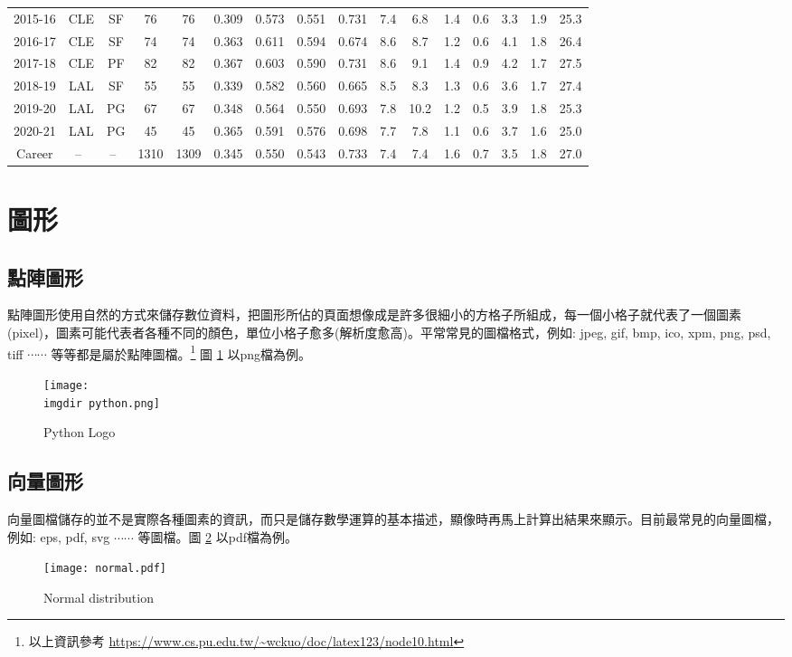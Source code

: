 \begin{table}[H]
\begin{center}
{\begin{tabular}{cccccccccccccccc}
2015-16 & CLE   & SF    & 76    & 76    & 0.309 & 0.573 & 0.551 & 0.731 & 7.4   & 6.8   & 1.4   & 0.6   & 3.3   & 1.9   & 25.3 \\
2016-17 & CLE   & SF    & 74    & 74    & 0.363 & 0.611 & 0.594 & 0.674 & 8.6   & 8.7   & 1.2   & 0.6   & 4.1   & 1.8   & 26.4 \\
2017-18 & CLE   & PF    & 82    & 82    & 0.367 & 0.603 & 0.590 & 0.731 & 8.6   & 9.1   & 1.4   & 0.9   & 4.2   & 1.7   & 27.5 \\
2018-19 & LAL   & SF    & 55    & 55    & 0.339 & 0.582 & 0.560 & 0.665 & 8.5   & 8.3   & 1.3   & 0.6   & 3.6   & 1.7   & 27.4 \\
2019-20 & LAL   & PG    & 67    & 67    & 0.348 & 0.564 & 0.550 & 0.693 & 7.8   & 10.2  & 1.2   & 0.5   & 3.9   & 1.8   & 25.3 \\
2020-21 & LAL   & PG    & 45    & 45    & 0.365 & 0.591 & 0.576 & 0.698 & 7.7   & 7.8   & 1.1   & 0.6   & 3.7   & 1.6   & 25.0 \\
\hline
Career  & --~   & --~   & 1310  & 1309  & 0.345 & 0.550 & 0.543 & 0.733 & 7.4   & 7.4   & 1.6   & 0.7   & 3.5   & 1.8   & 27.0 \\
\end{tabular}}
\end{center}
\end{table}\bigskip \bigskip
\section{圖形}
\subsection{點陣圖形}
點陣圖形使用自然的方式來儲存數位資料，把圖形所佔的頁面想像成是許多很細小的方格子所組成，每一個小格子就代表了一個圖素(pixel)，圖素可能代表者各種不同的顏色，單位小格子愈多(解析度愈高)。平常常見的圖檔格式，例如: jpeg, gif, bmp, ico, xpm, png, psd, tiff $ \cdots\cdots $ 等等都是屬於點陣圖檔。\footnote{以上資訊參考 \url{https://www.cs.pu.edu.tw/~wckuo/doc/latex123/node10.html}} 圖 \ref{fig:python} 以png檔為例。
\begin{figure}[h]
    \centering
        \texttt{[image: \\imgdir python.png]}
    \caption{Python Logo}
    \label{fig:python}
\end{figure}

\subsection{向量圖形}
向量圖檔儲存的並不是實際各種圖素的資訊，而只是儲存數學運算的基本描述，顯像時再馬上計算出結果來顯示。目前最常見的向量圖檔，例如: eps, pdf, svg $ \cdots\cdots $ 等圖檔。圖 \ref{fig:normal} 以pdf檔為例。
\begin{figure}[H]
    \centering
        \texttt{[image: normal.pdf]}
    \caption{Normal distribution}
    \label{fig:normal}
\end{figure}
